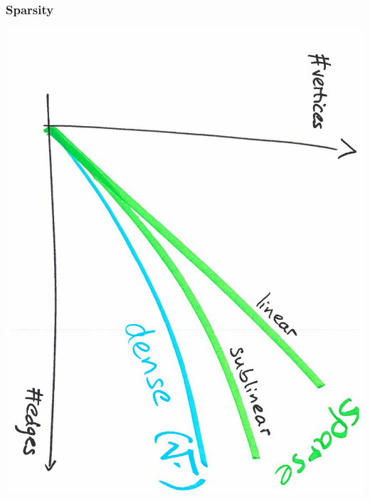 \documentclass[final,hyperref={pdfpagelabels=false},noamsthm]{beamer}
\begin{document}
\begin{frame}
	\frametitle{Sparsity}
	\includegraphics[angle=90,origin=c,scale=0.4]{fig/sparsity}
\end{frame}
\end{document}
